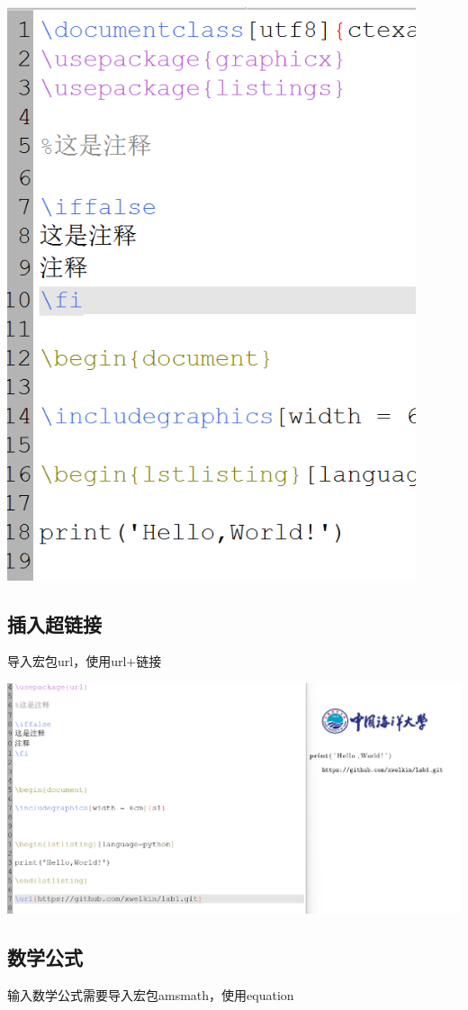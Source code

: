 \documentclass[UTF8,a4paper]{ctexart}
\begin{document}
\begin{sloppypar}
	\includegraphics[width = 12cm]{18}
	
	\subsection{插入超链接}
	导入宏包url，使用url+链接
	
	\includegraphics[width = 16cm]{19}
	
	\subsection{数学公式}
	输入数学公式需要导入宏包amsmath，使用equation
	

\end{sloppypar}
\end{document}
